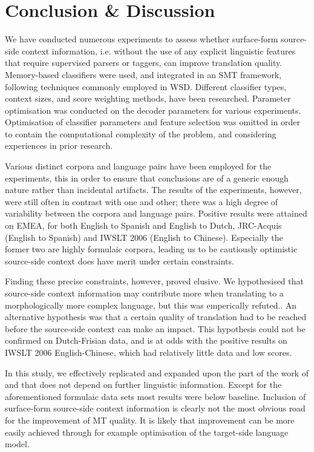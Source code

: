 \documentclass[smallextended]{svjour3}       %
\theoremstyle{break}
\begin{document}
\section{Conclusion \& Discussion} 

We have conducted numerous experiments to assess whether surface-form
source-side context information, i.e. without the use of any explicit
linguistic features that require supervised parsers or taggers, can improve
translation quality. Memory-based classifiers were used, and integrated in an
SMT framework, following techniques commonly employed in WSD. Different
classifier types, context sizes, and score weighting methods, have been
researched. Parameter optimisation was conducted on the decoder parameters for
various experiments. Optimisation of classifier parameters and feature
selection was omitted in order to contain the computational complexity of the
problem, and considering experiences in prior research.

Various distinct corpora and language pairs have been employed for the
experiments, this in order to ensure that conclusions are of a generic enough
nature rather than incidental artifacts. The results of the experiments,
however, were still often in contrast with one and other; there was a high
degree of variability between the corpora and language pairs. Positive results
were attained on EMEA, for both English to Spanish and English to Dutch,
JRC-Acquis (English to Spanish) and IWSLT 2006 (English to Chinese).
Especially the former two are highly formulaic corpora, leading us to be
cautiously optimistic source-side context does have merit under certain
constraints.

Finding these precise constraints, however, proved elusive. We hypothesised that
source-side context information may contribute more when translating to a
morphologically more complex language, but this was emperically refuted..
An alternative hypothesis was that a certain quality of translation had to
be reached before the source-side context can make an impact. This hypothesis
could not be confirmed on Dutch-Frisian data, and is at odds with the positive
results on IWSLT 2006 English-Chinese, which had relatively little data and low
scores.

In this study, we effectively replicated and expanded upon the part of the work
of \cite{Stroppa+07} and \cite{Rejwanul+11} that does not depend on further
linguistic information. Except for the aforementioned formulaic data sets most
results were below baseline. Inclusion of surface-form source-side context
information is clearly not the most obvious road for the improvement of MT
quality. It is likely that improvement can be more easily achieved through for
example optimisation of the target-side language model.
\end{document}
